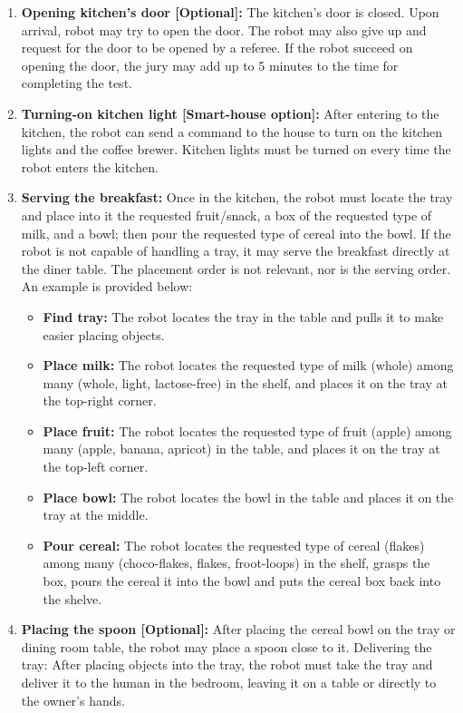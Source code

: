 \begin{enumerate}
	\item \textbf{Opening kitchen's door [Optional]:} The kitchen's door is closed. Upon arrival, robot may try to open the door. The robot may also give up and request for the door to be opened by a referee. If the robot succeed on opening the door, the jury may add up to 5 minutes to the time for completing the test.

	\item \textbf{Turning-on kitchen light [Smart-house option]:} After entering to the kitchen, the robot can send a command to the house to turn on the kitchen lights and the coffee brewer. Kitchen lights must be turned on every time the robot enters the kitchen.

	\item \textbf{Serving the breakfast:} Once in the kitchen, the robot must locate the tray and place into it the requested fruit/snack, a box of the requested type of milk, and a bowl; then pour the requested type of cereal into the bowl. If the robot is not capable of handling a tray, it may serve the breakfast directly at the diner table. The placement order is not relevant, nor is the serving order. An example is provided below:
	\begin{itemize}
		\item \textbf{Find tray:} The robot locates the tray in the table and pulls it to make easier placing objects.
		\item \textbf{Place milk:} The robot locates the requested type of milk (whole) among many (whole, light, lactose-free) in the shelf, and places it on the tray at the top-right corner.
		\item \textbf{Place fruit:} The robot locates the requested type of fruit (apple) among many (apple, banana, apricot) in the table, and places it on the tray at the top-left corner.
		\item \textbf{Place bowl:} The robot locates the bowl in the table and places it on the tray at the middle.
		\item \textbf{Pour cereal:} The robot locates the requested type of cereal (flakes) among many (choco-flakes, flakes, froot-loops) in the shelf, grasps the box, pours the cereal it into the bowl and puts the cereal box back into the shelve.
	\end{itemize}

	\item \textbf{Placing the spoon [Optional]:} After placing the cereal bowl on the tray or dining room table, the robot may place a spoon close to it.
	Delivering the tray: After placing objects into the tray, the robot must take the tray and deliver it to the human in the bedroom, leaving it on a table or directly to the owner's hands.


\end{enumerate}
